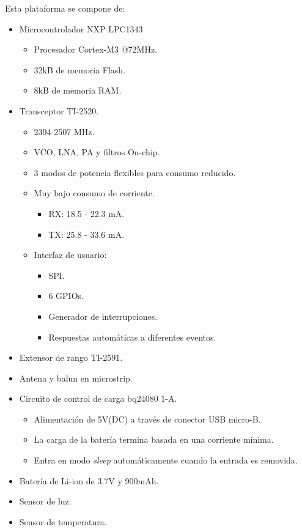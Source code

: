 \noindent Esta plataforma se compone de:
\begin{itemize}
\item Microcontrolador NXP LPC1343
   \begin{itemize}
   \item Procesador Cortex-M3 @72MHz. 
   \item 32kB de memoria Flash.
   \item 8kB de memoria RAM.
   \end{itemize}
\item Transceptor TI-2520.
		\begin{itemize}
			\item 2394-2507 MHz.
			\item VCO, LNA, PA y filtros On-chip.
			\item 3 modos de potencia flexibles para consumo reducido.
			\item Muy bajo consumo de corriente.
			\begin{itemize}
				\item RX: 18.5 - 22.3 mA.
				\item TX: 25.8 - 33.6 mA.
			\end{itemize}
			\item Interfaz de usuario:
			\begin{itemize}
				\item SPI.
				\item 6 GPIOs.
 				\item Generador de interrupciones.
				\item Respuestas automáticas a diferentes eventos.
			\end{itemize}
		\end{itemize}
\item Extensor de rango TI-2591.
\item Antena y balun en microstrip.
\item Circuito de control de carga bq24080 1-A.
		\begin{itemize}
			\item Alimentación de 5V(DC) a través de conector USB micro-B.
			\item La carga de la batería termina basada en una corriente mínima.
			\item Entra en modo \textit{sleep} automáticamente cuando la entrada es removida.		
		\end{itemize}
\item Batería de Li-ion de 3.7V y 900mAh.
\item Sensor de luz.
\item Sensor de temperatura.
\end{itemize}

